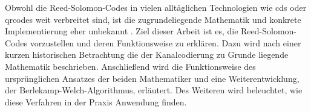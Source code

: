 Obwohl die Reed-Solomon-Codes in vielen alltäglichen Technologien wie \acrshort{cd}s oder \acrshort{qrcode}s weit verbreitet sind, ist die zugrundeliegende Mathematik und konkrete Implementierung eher unbekannt \cite[Kapitel 1.5]{wickerReedSolomonCodes1994}. 
Ziel dieser Arbeit ist es, die Reed-Solomon-Codes vorzustellen und deren Funktionsweise zu erklären. 
Dazu wird nach einer kurzen historischen Betrachtung die der Kanalcodierung zu Grunde liegende Mathematik beschrieben.
Anschließend wird die Funktionsweise des ursprünglichen Ansatzes der beiden Mathematiker und eine Weiterentwicklung, der Berlekamp-Welch-Algorithmus, erläutert.
Des Weiteren wird beleuchtet, wie diese Verfahren in der Praxis Anwendung finden. 

